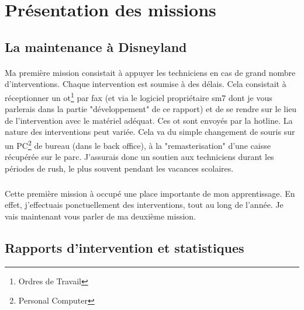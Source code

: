 \section{Présentation des missions}

\subsection{La maintenance à Disneyland}%
\paragraph{}
Ma première mission consistait à appuyer les techniciens en cas de grand nombre d'interventions. Chaque intervention est soumise à des délais. Cela consistait à réceptionner un \gls{ot}\footnote{Ordres de Travail} par fax (et via le logiciel propriétaire \gls{sm7} dont je vous parlerais dans la partie "développement" de ce rapport) et de se rendre sur le lieu de l'intervention avec le matériel adéquat. Ces \gls{ot} sont envoyés par la \foreignlanguage{english}{hotline}. La nature des interventions peut variée. Cela va du simple changement de souris sur un PC\footnote{\foreignlanguage{english}{Personal Computer}} de bureau (dans le \Gls{back office}), à la "remasterisation" d'une caisse récupérée sur le parc. J'assurais donc un soutien aux techniciens durant les périodes de \foreignlanguage{english}{rush}, le plus souvent pendant les vacances scolaires.
\subparagraph{}
Cette première mission à occupé une place importante de mon apprentissage. En effet, j'effectuais ponctuellement des interventions, tout au long de l'année. Je vais maintenant vous parler de ma deuxième mission.


\subsection{Rapports d'intervention et statistiques}%
